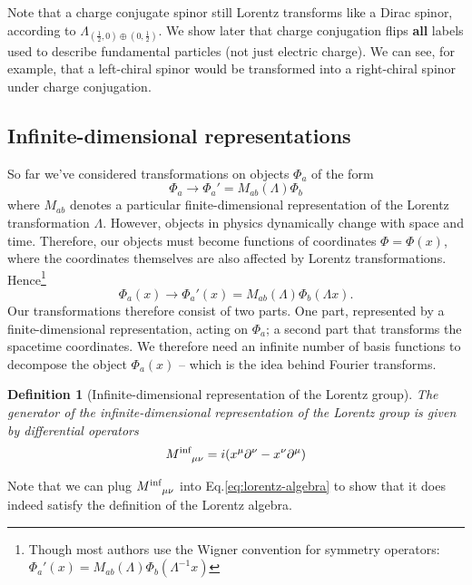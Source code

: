 \documentclass[11pt]{article}
\numberwithin{equation}{section}
\newcommand{\tn}[2]{\tensor{#1}{#2}}
\newtheorem{defn}{Definition}[section]
\begin{document}
Note that a charge conjugate spinor still Lorentz transforms like a Dirac spinor, according to $\Lambda_{(\frac{1}{2},0) \oplus (0, \frac{1}{2})}$. We show later that charge conjugation flips \textbf{all} labels used to describe fundamental particles (not just electric charge). We can see, for example, that a left-chiral spinor would be transformed into a right-chiral spinor under charge conjugation. 

\subsection{Infinite-dimensional representations}
So far we've considered transformations on objects $\Phi_a$ of the form
\begin{equation}
\Phi_a \rightarrow \Phi_a' = M_{ab}(\Lambda)\Phi_b
\end{equation}
where $M_{ab}$ denotes a particular finite-dimensional representation of the Lorentz transformation $\Lambda$. However, objects in physics dynamically change with space and time. Therefore, our objects must become functions of coordinates $\Phi = \Phi(x)$, where the coordinates themselves are also affected by Lorentz transformations. Hence\footnote{Though most authors use the Wigner convention for symmetry operators: $\Phi_a'(x) = M_{ab}(\Lambda)\Phi_b(\Lambda^{-1} x)$}
\begin{equation}
\Phi_a(x) \rightarrow \Phi_a'(x) = M_{ab}(\Lambda)\Phi_b(\Lambda x).
\end{equation}
Our transformations therefore consist of two parts. One part, represented by a finite-dimensional representation, acting on $\Phi_a$; a second part that transforms the spacetime coordinates. We therefore need an infinite number of basis functions to decompose the object $\Phi_a(x)$ -- which is the idea behind Fourier transforms. 

\begin{defn}[Infinite-dimensional representation of the Lorentz group]
The generator of the infinite-dimensional representation of the Lorentz group is given by differential operators
\begin{equation}
\tn{{M^{\text{inf}}}}{_\mu_\nu} = i(x^\mu \partial^\nu - x^\nu \partial^\mu)
\end{equation}
\end{defn}
Note that we can plug $\tn{{M^{\text{inf}}}}{_\mu_\nu}$ into Eq.\eqref{eq:lorentz-algebra} to show that it does indeed satisfy the definition of the Lorentz algebra.
\end{document}
